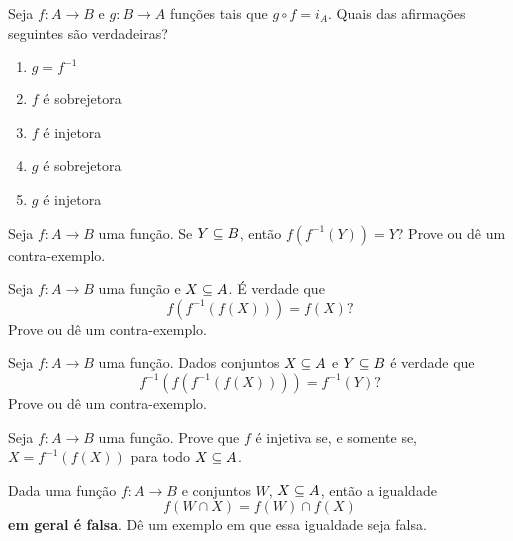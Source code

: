 \documentclass[12pt]{exam}
\begin{document}
\vspace{.3cm}

\questao{} Seja $f : A \to B$ e $g : B \to A$ funções tais que $g \circ f = i_A$. Quais das afirmações seguintes são verdadeiras?
\begin{enumerate}[label={\alph*})]
    \item $g = f^{-1}$

    \item $f$ é sobrejetora

    \item $f$ é injetora

    \item $g$ é sobrejetora

    \item $g$ é injetora
\end{enumerate}

\vspace{.3cm}

\questao{} Seja $f : A \to B$ uma função. Se $Y \subseteq B$, então $f(f^{-1}(Y)) = Y$? Prove ou d\^e um contra-exemplo.

\vspace{.3cm}

\questao{} Seja $f : A \to B$ uma função e $X \subseteq A$. É verdade que
\[
f(f^{-1}(f(X))) = f(X)?
\]
Prove ou d\^e um contra-exemplo.

\vspace{.3cm}

\questao{} Seja $f : A \to B$ uma função. Dados conjuntos $X \subseteq A$ e $Y \subseteq B$ é verdade que
\[
f^{-1}(f(f^{-1}(f(X)))) = f^{-1}(Y)?
\]
Prove ou d\^e um contra-exemplo.

\vspace{.3cm}

\questao{} Seja $f : A \to B$ uma função. Prove que $f$ é injetiva se, e somente se, $X = f^{-1}(f(X))$ para todo $X \subseteq A$.

\vspace{.3cm}

\questao{} Dada uma função $f : A \to B$ e conjuntos $W$, $X \subseteq A$, então a igualdade
\[
f(W \cap X) = f(W) \cap f(X)
\]
\textbf{em geral é falsa}. D\^e um exemplo em que essa igualdade seja falsa.

\vspace{.3cm}
\end{document}
